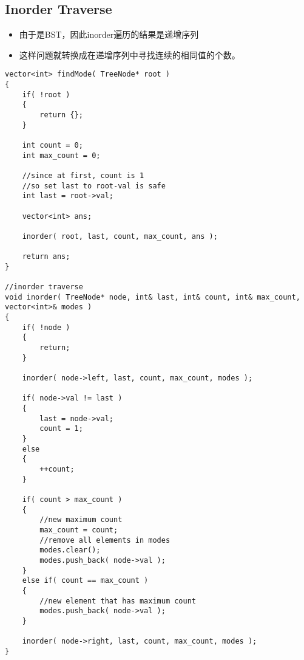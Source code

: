 \subsection{Inorder Traverse}
\begin{itemize}
\item 由于是BST，因此inorder遍历的结果是递增序列
\item 这样问题就转换成在递增序列中寻找连续的相同值的个数。
\end{itemize}

\setcounter{lstlisting}{0}
\begin{lstlisting}[style=customc, caption={Inorder Traverse}]
vector<int> findMode( TreeNode* root )
{
    if( !root )
    {
        return {};
    }

    int count = 0;
    int max_count = 0;

    //since at first, count is 1
    //so set last to root-val is safe
    int last = root->val;

    vector<int> ans;

    inorder( root, last, count, max_count, ans );

    return ans;
}

//inorder traverse
void inorder( TreeNode* node, int& last, int& count, int& max_count, vector<int>& modes )
{
    if( !node )
    {
        return;
    }

    inorder( node->left, last, count, max_count, modes );

    if( node->val != last )
    {
        last = node->val;
        count = 1;
    }
    else
    {
        ++count;
    }

    if( count > max_count )
    {
        //new maximum count
        max_count = count;
        //remove all elements in modes
        modes.clear();
        modes.push_back( node->val );
    }
    else if( count == max_count )
    {
        //new element that has maximum count
        modes.push_back( node->val );
    }

    inorder( node->right, last, count, max_count, modes );
}
\end{lstlisting}